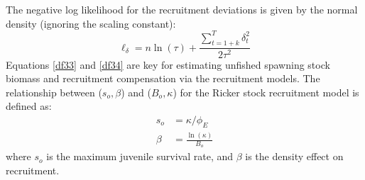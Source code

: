\documentclass[11pt]{article}   %
\begin{document}
The negative log likelihood for the recruitment deviations is given by the normal density (ignoring the scaling constant):
\begin{equation}\label{df34}
 \ell_\delta = n\ln(\tau) + \frac{\sum_{t=1+k}^T \delta^2_t}{2\tau^2}
\end{equation}
Equations \eqref{df33} and \eqref{df34} are key for estimating unfished spawning stock biomass and recruitment compensation via the recruitment models.  The relationship between ($s_o,\beta$) and ($B_o,\kappa$) for the Ricker stock recruitment model is defined as:
\begin{align}
s_o &= \kappa/\phi_E\\
\beta&=%
\frac{\ln(\kappa)}{B_o} %
\end{align}
where $s_o$ is the maximum juvenile survival rate, and $\beta$ is the density effect on recruitment.

%
\end{document}
